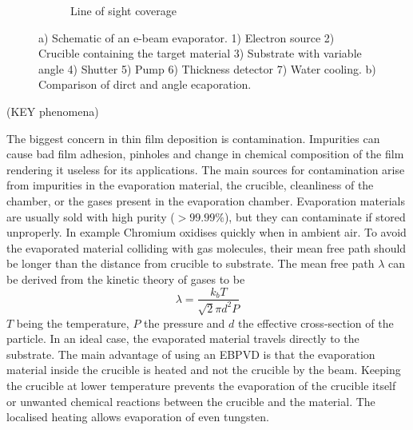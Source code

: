 \documentclass[draft]{jyflluk}
\begin{document}
\begin{figure}
\begin{subfigure}[ht]{0.35\textwidth}
        \caption{Line of sight coverage} \label{fig:angle_evap}
    \end{subfigure}
    \caption{a) Schematic of an e-beam evaporator. 1) Electron source 2) Crucible containing the target material 3) Substrate with variable angle 4) Shutter 5) Pump 6) Thickness detector 7) Water cooling. b) Comparison of dirct and angle ecaporation. } \label{fig:evap}
\end{figure}




(KEY phenomena)

The biggest concern in thin film deposition is contamination. Impurities can cause bad film adhesion, pinholes and change in chemical composition of the film rendering it useless for its applications. The main sources for contamination arise from impurities in the evaporation material, the crucible, cleanliness of the chamber, or the gases present in the evaporation chamber. Evaporation materials are usually sold with high purity ($>99.99 \percent$), but they can contaminate if stored unproperly. In example Chromium oxidises quickly when in ambient air. To avoid the evaporated material colliding with gas molecules, their mean free path should be longer than the distance from crucible to substrate. The mean free path $\lambda$ can be derived from the kinetic theory of gases to be 
%
\begin{equation}
    \label{eq:mean_free}
    \lambda = \frac{k_b T}{\sqrt{2}\pi d^2 P}
 \end{equation}
 $T$ being the temperature, $P$ the pressure and $d$ the effective cross-section of the particle. In an ideal case, the evaporated material travels directly to the substrate. The main advantage of using an EBPVD is that the evaporation material inside the crucible is heated and not the crucible by the beam. Keeping the crucible at lower temperature prevents the evaporation of the crucible itself or unwanted chemical reactions between the crucible and the material. The localised heating allows evaporation of even tungsten. \cite{franssila2010introduction}
\end{document}
